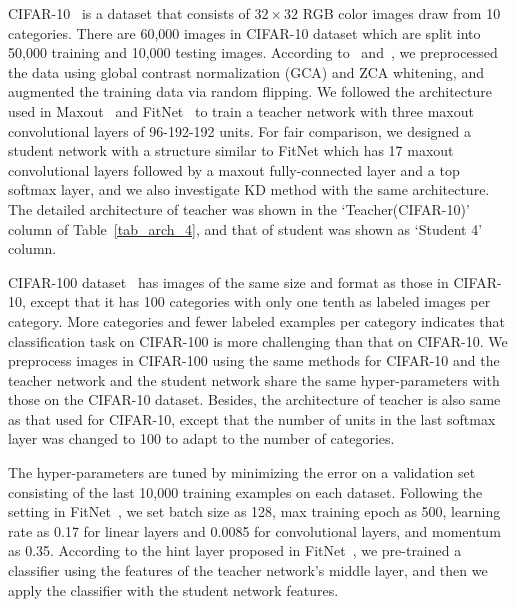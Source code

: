 \documentclass[journal]{IEEEtran}
\newcommand{\Tref}[1]{Table~\ref{#1}}
\begin{document}
CIFAR-10~\cite{krizhevsky2009learning} is a dataset that consists of $32\times 32$ RGB color images draw from 10 categories. There are 60,000 images in CIFAR-10 dataset which are split into 50,000 training and 10,000 testing images. According to~\cite{goodfellow2013maxout} and~\cite{romero2014fitnets}, we preprocessed the data using global contrast normalization (GCA) and ZCA whitening, and augmented the training data via random flipping. We followed the architecture used in Maxout~\cite{goodfellow2013maxout} and FitNet~\cite{romero2014fitnets} to train a teacher network with three maxout convolutional layers of 96-192-192 units. For fair comparison, we designed a student network with a structure similar to FitNet which has 17 maxout convolutional layers followed by a maxout fully-connected layer and a top softmax layer, and we also investigate KD method with the same architecture. The detailed architecture of teacher was shown in the `Teacher(CIFAR-10)' column of \Tref{tab_arch_4}, and that of student was shown as `Student 4' column.

CIFAR-100 dataset~\cite{krizhevsky2009learning} has images of the same size and format as those in CIFAR-10, except that it has 100 categories with only one tenth as labeled images per category. More categories and fewer labeled examples per category indicates that classification task on CIFAR-100 is more challenging than that on CIFAR-10. We preprocess images in CIFAR-100 using the same methods for CIFAR-10 and the teacher network and the student network share the same hyper-parameters with those on the CIFAR-10 dataset. Besides, the architecture of teacher is also same as that used for CIFAR-10, except that the number of units in the last softmax layer was changed to 100 to adapt to the number of categories. 

The hyper-parameters are tuned by minimizing the error on a validation set consisting of the last 10,000 training examples on each dataset. Following the setting in FitNet~\cite{romero2014fitnets}, we set batch size as 128, max training epoch as 500, learning rate as 0.17 for linear layers and 0.0085 for convolutional layers, and momentum as 0.35. According to the hint layer proposed in FitNet~\cite{romero2014fitnets}, we pre-trained a classifier using the features of the teacher network's middle layer, and then we apply the classifier with the student network features.   
\end{document}
